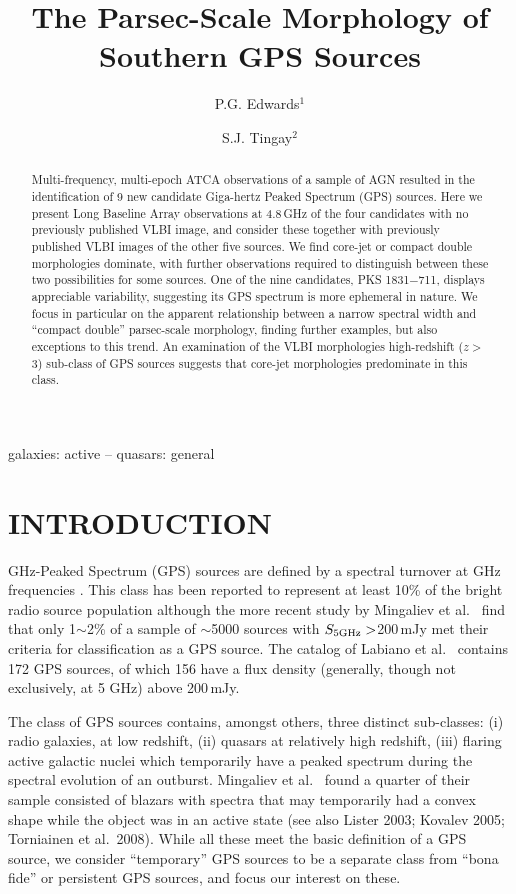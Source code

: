 \documentclass{pasa}%
\title[The Parsec-Scale Morphology of Southern GPS sources]{The Parsec-Scale Morphology of Southern GPS Sources}
\author[P.G. Edwards and S.J. Tingay]{P.G. Edwards$^1$ \and S.J. Tingay$^{2}$ \\
\affil{$^1$Australia Telescope National Facility, CSIRO Astronomy and Space Science, Epping, NSW, Australia}%
\affil{$^2$International Centre for Radio Astronomy Research, Curtin University, Bentley, WA, Australia}}%
\begin{document}
%
%
\begin{abstract}
Multi-frequency, multi-epoch ATCA observations of a  sample of AGN resulted
in the identification of 9 new candidate Giga-hertz Peaked Spectrum
(GPS) sources.  Here we present Long Baseline Array observations at
4.8\,GHz of the four candidates with no previously published VLBI
image, and consider these together with previously published VLBI
images
of the other five sources. We find core-jet or compact double
morphologies dominate, with further observations required to
distinguish between these two possibilities for some sources.  One of the nine
candidates, PKS 1831$-$711, displays appreciable variability,
suggesting its GPS spectrum is more ephemeral in nature.  We focus in
particular on the apparent relationship between a narrow spectral
width and ``compact double'' parsec-scale morphology, finding further
examples, but also exceptions to this trend.  An examination of the
VLBI morphologies high-redshift ($z>$3) sub-class of GPS sources
suggests that core-jet morphologies predominate in this class.
\end{abstract}
%
\begin{keywords}
galaxies: active -- quasars: general
\end{keywords}
%
\maketitle%
%
\section{INTRODUCTION }
\label{sec:intro}

GHz-Peaked Spectrum (GPS) sources are defined by a spectral turnover
at GHz frequencies
\cite{ode98}.
This class has been reported to represent at
least 10\% of the bright radio source population \cite{ode98} although
the more recent study by Mingaliev et al.\  find that only
1$\sim$2\% of a sample of $\sim$5000 sources with $S_{\rm 5GHz}>$200\,mJy 
met their criteria for classification as a GPS source.  The catalog of
Labiano et al.\  contains 172 GPS sources, of which
156 have a flux density (generally, though not exclusively, at 5 GHz)
above 200\,mJy.

The class of GPS sources contains, amongst others, three distinct
sub-classes:
(i) radio galaxies, at low redshift,
(ii) quasars at relatively high redshift,
(iii) flaring active galactic nuclei which 
temporarily have a peaked spectrum during the spectral
evolution of an outburst.
Mingaliev et al.\  found a quarter of 
their sample consisted of blazars with spectra that may temporarily had a
convex shape while the object was in an active state
(see also Lister 2003; Kovalev 2005; Torniainen et al.\ 2008).
While all these meet the basic definition of a GPS source, we
consider ``temporary'' GPS sources to be a separate class from
``bona fide'' or persistent GPS sources, and focus our interest on these.
\end{document}
